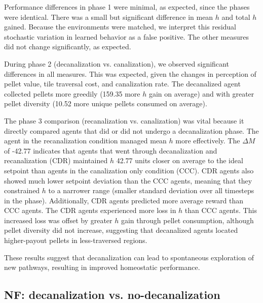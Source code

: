 Performance differences in phase 1 were minimal, as expected, since the phases were identical. There was a small but significant difference in mean \(h\) and total \(h\) gained. Because the environments were matched, we interpret this residual stochastic variation in learned behavior as a false positive. The other measures did not change significantly, as expected.

During phase 2 (decanalization vs. canalization), we observed significant differences in all measures. This was expected, given the changes in perception of pellet value, tile traversal cost, and canalization rate. The decanalized agent collected pellets more greedily (159.35 more \(h\) gain on average) and with greater pellet diversity (10.52 more unique pellets consumed on average).

The phase 3 comparison (recanalization vs. canalization) was vital because it directly compared agents that did or did not undergo a decanalization phase. The agent in the recanalization condition managed mean \(h\) more effectively. The $\Delta M$ of -42.77 indicates that agents that went through decanalization and recanalization (CDR) maintained $h$ 42.77 units closer on average to the ideal setpoint than agents in the canalization only condition (CCC). CDR agents also showed much lower setpoint deviation than the CCC agents, meaning that they constrained $h$ to a narrower range (smaller standard deviation over all timesteps in the phase). Additionally, CDR agents predicted more average reward than CCC agents. The CDR agents experienced more loss in \(h\) than CCC agents. This increased loss was offset by greater \(h\) gain through pellet consumption, although pellet diversity did not increase, suggesting that decanalized agents located higher-payout pellets in less-traversed regions.

These results suggest that decanalization can lead to spontaneous exploration of new pathways, resulting in improved homeostatic performance.

\subsection{NF: decanalization vs. no-decanalization}

